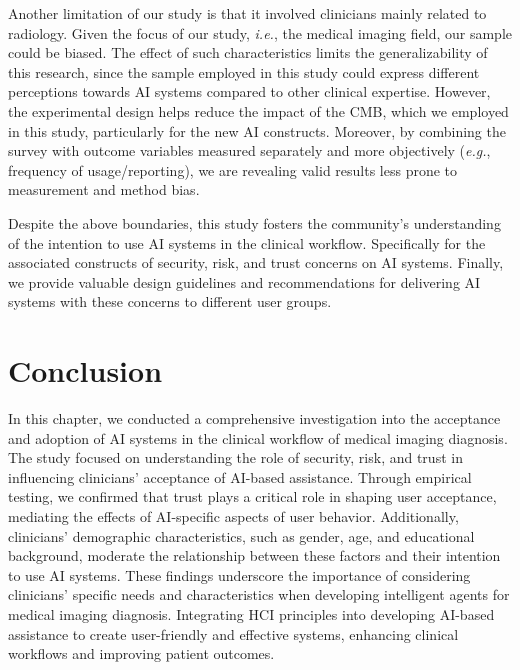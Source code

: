 Another limitation of our study is that it involved clinicians mainly related to radiology.
Given the focus of our study, {\it i.e.}, the medical imaging field, our sample could be biased.
The effect of such characteristics limits the generalizability of this research, since the sample employed in this study could express different perceptions towards \ac{AI} systems compared to other clinical expertise.
However, the experimental design helps reduce the impact of the \ac{CMB}, which we employed in this study, particularly for the new \ac{AI} constructs.
Moreover, by combining the survey with outcome variables measured separately and more objectively ({\it e.g.}, frequency of usage/reporting), we are revealing valid results less prone to measurement and method bias.

Despite the above boundaries, this study fosters the community's understanding of the intention to use \ac{AI} systems in the clinical workflow. Specifically for the associated constructs of security, risk, and trust concerns on \ac{AI} systems.
Finally, we provide valuable design guidelines and recommendations for delivering \ac{AI} systems with these concerns to different user groups.

\section{Conclusion}
\label{sec:chap004008}

In this chapter, we conducted a comprehensive investigation into the acceptance and adoption of \ac{AI} systems in the clinical workflow of medical imaging diagnosis.
The study focused on understanding the role of security, risk, and trust in influencing clinicians' acceptance of \ac{AI}-based assistance.
Through empirical testing, we confirmed that trust plays a critical role in shaping user acceptance, mediating the effects of \ac{AI}-specific aspects of user behavior.
Additionally, clinicians' demographic characteristics, such as gender, age, and educational background, moderate the relationship between these factors and their intention to use \ac{AI} systems.
These findings underscore the importance of considering clinicians' specific needs and characteristics when developing intelligent agents for medical imaging diagnosis.
Integrating \ac{HCI} principles into developing \ac{AI}-based assistance to create user-friendly and effective systems, enhancing clinical workflows and improving patient outcomes.

